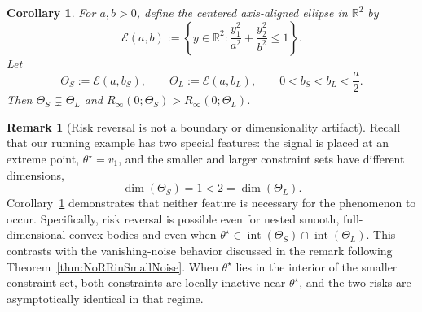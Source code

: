 \documentclass[11pt]{article}
\theoremstyle{plain}
\newtheorem{corollary}[theorem]{Corollary}
\theoremstyle{definition}
\newtheorem*{remark}{Remark}
\providecommand{\mathbbm}{\mathbb} %
\newcommand{\R}{\mathbbm{R}}
\newcommand{\mcE}{\mathcal{E}}
\begin{document}
\begin{corollary} \label{cor:ellipse}
For $a,b>0$, define the centered axis-aligned ellipse in $\R^2$ by
\[
    \mcE(a,b)
    :=
    \left\{
        y \in\mathbb R^2:
        \frac{y_1^2}{a^2}+\frac{y_2^2}{b^2}\le1
    \right\}.
\]
Let 
\[ \Theta_S:=\mcE(a,b_S), \qquad \Theta_L:=\mcE(a,b_L), \qquad 0<b_S<b_L<\frac a2. 
\]
Then $\Theta_S \subsetneq \Theta_L$ and $R_\infty(0; \Theta_S)
    >
    R_\infty(0;\Theta_L)$.
\end{corollary}



\begin{remark}[Risk reversal is not a boundary or dimensionality artifact]
Recall that our running example has two special features: the signal is placed
at an extreme point, $\theta^\star=v_1$, and the smaller and larger constraint sets have different dimensions,
\[
    \dim(\Theta_S)=1<2=\dim(\Theta_L).
\]
Corollary~\ref{cor:ellipse} demonstrates that neither feature is necessary for the phenomenon to occur. Specifically, risk reversal is possible even for nested smooth, full-dimensional convex bodies and even when $\theta^\star\in \operatorname{int}(\Theta_S) \cap \operatorname{int}(\Theta_L)$.
This contrasts with the vanishing-noise behavior discussed in the remark following Theorem~\ref{thm:NoRRinSmallNoise}. When $\theta^\star$ lies in the
interior of the smaller constraint set, both constraints are locally inactive
near $\theta^\star$, and the two risks are asymptotically identical in that regime.
\end{remark}
\end{document}
